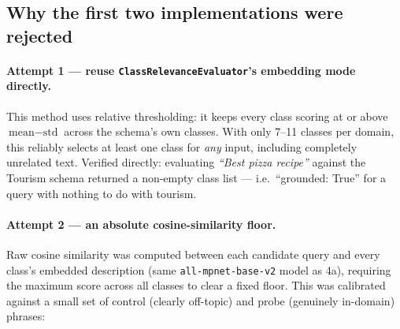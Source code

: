 \documentclass[11pt,a4paper]{article}
\newcommand{\code}[1]{\texttt{#1}}
\begin{document}
\subsection{Why the first two implementations were rejected}

\paragraph{Attempt 1 --- reuse \code{ClassRelevanceEvaluator}'s embedding mode directly.} This
method uses relative thresholding: it keeps every class scoring at or above
$\text{mean} - \text{std}$ across the schema's own classes. With only 7--11 classes per domain,
this reliably selects at least one class for \emph{any} input, including completely unrelated
text. Verified directly: evaluating \emph{``Best pizza recipe''} against the Tourism schema
returned a non-empty class list --- i.e.\ ``grounded: True'' for a query with nothing to do with
tourism.

\paragraph{Attempt 2 --- an absolute cosine-similarity floor.} Raw cosine similarity was computed
between each candidate query and every class's embedded description (same \code{all-mpnet-base-v2}
model as 4a), requiring the maximum score across all classes to clear a fixed floor. This was
calibrated against a small set of control (clearly off-topic) and probe (genuinely in-domain)
phrases:
\end{document}
